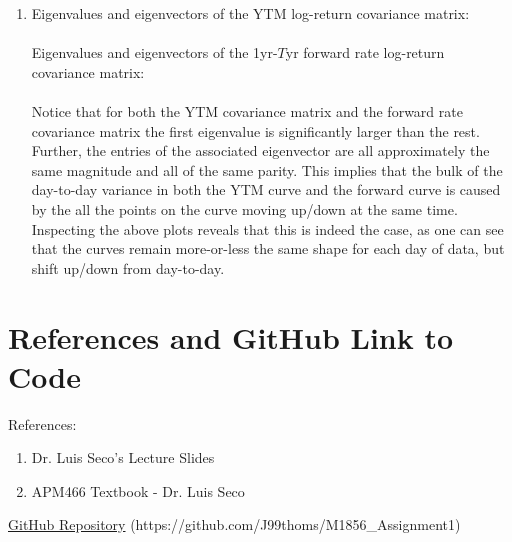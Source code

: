 \documentclass{article}
\begin{document}
\begin{enumerate}
		
		
		\item Eigenvalues and eigenvectors of the YTM log-return covariance matrix:\\ \\
		Eigenvalues and eigenvectors of the 1yr-$T$yr forward rate log-return covariance matrix:\\ \\
		Notice that for both the YTM covariance matrix and the forward rate covariance matrix the first eigenvalue is significantly larger than the rest. Further, the entries of the associated eigenvector are all approximately the same magnitude and all of the same parity. This implies that the bulk of the day-to-day variance in both the YTM curve and the forward curve is caused by the all the points on the curve moving up/down at the same time. Inspecting the above plots reveals that this is indeed the case, as one can see that the curves remain more-or-less the same shape for each day of data, but shift up/down from day-to-day.
	\end{enumerate}
	
	\newpage
	\section*{References and GitHub Link to Code}
	References:
	\begin{enumerate}
		\item Dr. Luis Seco's Lecture Slides
		\item APM466 Textbook - Dr. Luis Seco
	\end{enumerate}
	\href{https://github.com/J99thoms/M1856_Assignment1}{GitHub Repository} (https://github.com/J99thoms/M1856\_Assignment1)
	


		
\end{document}
